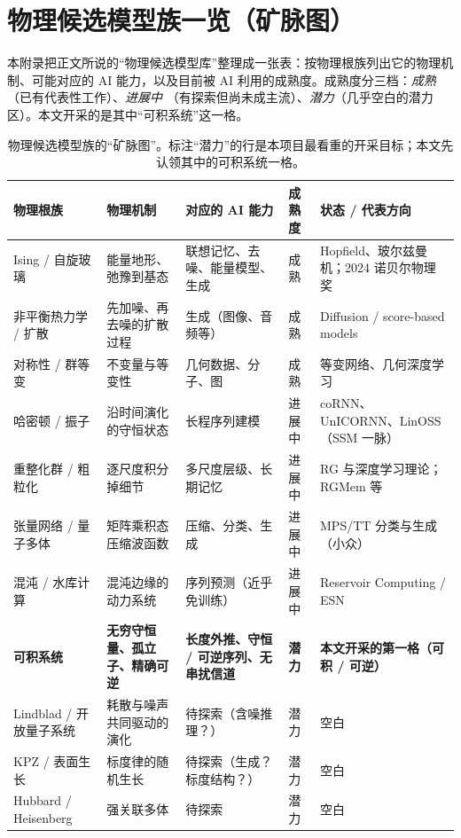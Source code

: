 \documentclass[11pt]{article}
\theoremstyle{definition}
\theoremstyle{plain}
\begin{document}
\section{物理候选模型族一览（矿脉图）}\label{app:catalog}
本附录把正文所说的“物理候选模型库”整理成一张表：按物理根族列出它的物理机制、可能对应的
AI 能力，以及目前被 AI 利用的成熟度。成熟度分三档：\emph{成熟}（已有代表性工作）、\emph{进展中}
（有探索但尚未成主流）、\emph{潜力}（几乎空白的潜力区）。本文开采的是其中“可积系统”这一格。

\begin{table}[h]
\centering
\footnotesize
\setlength{\tabcolsep}{4pt}
\renewcommand{\arraystretch}{1.25}
\begin{tabularx}{\textwidth}{@{}>{\raggedright\arraybackslash}p{2.0cm}
  >{\raggedright\arraybackslash}X >{\raggedright\arraybackslash}X
  >{\centering\arraybackslash}p{1.0cm} >{\raggedright\arraybackslash}X@{}}
\toprule
物理根族 & 物理机制 & 对应的 AI 能力 & 成熟度 & 状态 / 代表方向 \\
\midrule
Ising / 自旋玻璃 & 能量地形、弛豫到基态 & 联想记忆、去噪、能量模型、生成 & 成熟 & Hopfield、玻尔兹曼机；2024 诺贝尔物理奖 \\
非平衡热力学 / 扩散 & 先加噪、再去噪的扩散过程 & 生成（图像、音频等） & 成熟 & Diffusion / score-based models \\
对称性 / 群等变 & 不变量与等变性 & 几何数据、分子、图 & 成熟 & 等变网络、几何深度学习 \\
哈密顿 / 振子 & 沿时间演化的守恒状态 & 长程序列建模 & 进展中 & coRNN、UnICORNN、LinOSS（SSM 一脉） \\
重整化群 / 粗粒化 & 逐尺度积分掉细节 & 多尺度层级、长期记忆 & 进展中 & RG 与深度学习理论；RGMem 等 \\
张量网络 / 量子多体 & 矩阵乘积态压缩波函数 & 压缩、分类、生成 & 进展中 & MPS/TT 分类与生成（小众） \\
混沌 / 水库计算 & 混沌边缘的动力系统 & 序列预测（近乎免训练） & 进展中 & Reservoir Computing / ESN \\
\textbf{可积系统} & \textbf{无穷守恒量、孤立子、精确可逆} & \textbf{长度外推、守恒 / 可逆序列、无串扰信道} & \textbf{潜力} & \textbf{本文开采的第一格（可积 / 可逆）} \\
Lindblad / 开放量子系统 & 耗散与噪声共同驱动的演化 & 待探索（含噪推理？） & 潜力 & 空白 \\
KPZ / 表面生长 & 标度律的随机生长 & 待探索（生成？标度结构？） & 潜力 & 空白 \\
Hubbard / Heisenberg & 强关联多体 & 待探索 & 潜力 & 空白 \\
\bottomrule
\end{tabularx}
\caption{物理候选模型族的“矿脉图”。标注“潜力”的行是本项目最看重的开采目标；本文先认领其中的可积系统一格。}
\label{tab:catalog}
\end{table}
\end{document}
